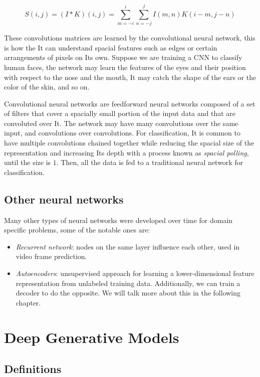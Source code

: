 \documentclass[11pt]{article}
\begin{document}
\[S(i, j) = (I*K)(i, j) = \sum_{m=-i}^i\sum_{n=-j}^jI(m, n)K(i-m,j-n)\]

These convolutions matrices are learned by the convolutional neural
network, this is how the It can understand spacial features such as
edges or certain arrangements of pixels on Its own. Suppose we are
training a CNN to classify human faces, the network may learn the
features of the eyes and their position with respect to the nose and the
mouth, It may catch the shape of the ears or the color of the skin, and
so on.

Convolutional neural networks are feedforward neural networks composed
of a set of filters that cover a spacially small portion of the input
data and that are convoluted over It. The network may have many
convolutions over the same input, and convolutions over convolutions.
For classification, It is common to have multiple convolutions chained
together while reducing the spacial size of the representation and
increasing Its depth with a process known as \emph{spacial polling},
until the size is \(1\). Then, all the data is fed to a traditional
neural network for classification.

\subsection{Other neural networks}\label{other-neural-networks}

Many other types of neural networks were developed over time for domain
specific problems, some of the notable ones are:

\begin{itemize}
\tightlist
\item
  \emph{Recurrent network}: nodes on the same layer influence each
  other, used in video frame prediction.
\item
  \emph{Autoencoders}: unsupervised approach for learning a
  lower-dimensional feature representation from unlabeled training data.
  Additionally, we can train a decoder to do the opposite. We will talk
  more about this in the following chapter.
\end{itemize}

\section{Deep Generative Models}\label{deep-generative-models}

\subsection{Definitions}\label{definitions}
\end{document}
